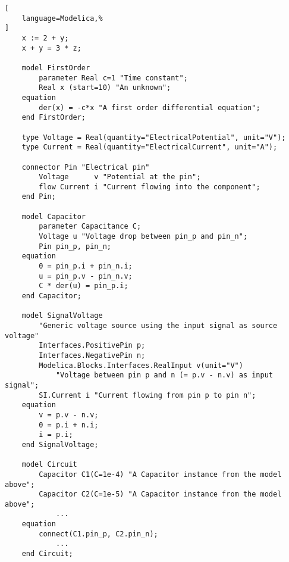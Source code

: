 \begin{lstlisting}[
    language=Modelica,%
]
    x := 2 + y;
    x + y = 3 * z;

    model FirstOrder
        parameter Real c=1 "Time constant";
        Real x (start=10) "An unknown";
    equation
        der(x) = -c*x "A first order differential equation";
    end FirstOrder;

    type Voltage = Real(quantity="ElectricalPotential", unit="V");
    type Current = Real(quantity="ElectricalCurrent", unit="A");

    connector Pin "Electrical pin"
        Voltage      v "Potential at the pin";
        flow Current i "Current flowing into the component";
    end Pin;

    model Capacitor
        parameter Capacitance C;
        Voltage u "Voltage drop between pin_p and pin_n";
        Pin pin_p, pin_n;
    equation
        0 = pin_p.i + pin_n.i;
        u = pin_p.v - pin_n.v;
        C * der(u) = pin_p.i;
    end Capacitor;

    model SignalVoltage
        "Generic voltage source using the input signal as source voltage"
        Interfaces.PositivePin p;
        Interfaces.NegativePin n;
        Modelica.Blocks.Interfaces.RealInput v(unit="V") 
            "Voltage between pin p and n (= p.v - n.v) as input signal";
        SI.Current i "Current flowing from pin p to pin n";
    equation
        v = p.v - n.v;
        0 = p.i + n.i;
        i = p.i;
    end SignalVoltage;

    model Circuit
        Capacitor C1(C=1e-4) "A Capacitor instance from the model above";
        Capacitor C2(C=1e-5) "A Capacitor instance from the model above";
            ...
    equation
        connect(C1.pin_p, C2.pin_n);
            ...
    end Circuit;
\end{lstlisting}
